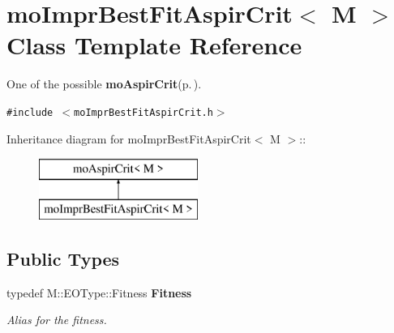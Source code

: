 \section{mo\-Impr\-Best\-Fit\-Aspir\-Crit$<$ M $>$ Class Template Reference}
\label{classmo_impr_best_fit_aspir_crit}
One of the possible {\bf mo\-Aspir\-Crit}{\rm (p.\,\pageref{classmo_aspir_crit})}.  


{\tt \#include $<$mo\-Impr\-Best\-Fit\-Aspir\-Crit.h$>$}

Inheritance diagram for mo\-Impr\-Best\-Fit\-Aspir\-Crit$<$ M $>$::\begin{figure}[H]
\begin{center}
\leavevmode
\includegraphics[height=2cm]{classmo_impr_best_fit_aspir_crit}
\end{center}
\end{figure}
\subsection*{Public Types}
\begin{CompactItemize}
\item 
typedef M::EOType::Fitness {\bf Fitness}\label{classmo_impr_best_fit_aspir_crit_0bc1a8c9af99781e662570c04750cca8}

\begin{CompactList}\small\item\em Alias for the fitness. \item\end{CompactList}\end{CompactItemize}
